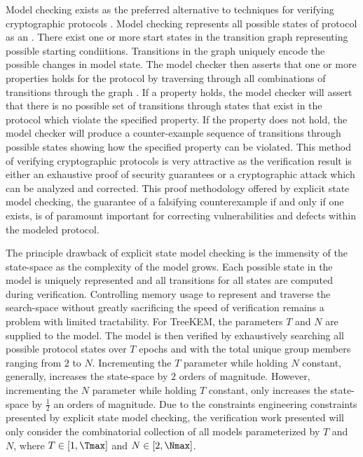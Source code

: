 Model checking exists as the preferred alternative to  techniques for verifying cryptographic protocols \autocite{kacprzak2006comparing, lomuscio2007verification, van2004symbolic}.
Model checking represents all possible states of protocol as an  \autocite{clarke1981design}.
There exist one or more start states in the transition graph representing possible starting condiitions.
Transitions in the graph uniquely encode the possible changes in model state.
The model checker then asserts that one or more properties holds for the protocol by traversing through all combinations of transitions through the graph \autocite{Vardi1986}.
If a property holds, the model checker will assert that there is no possible set of transitions through states that exist in the protocol which violate the specified property.
If the property does not hold, the model checker will produce a counter-example sequence of transitions through possible states showing how the specified property can be violated.
This method of verifying cryptographic protocols is very attractive as the verification result is either an exhaustive proof of security guarantees or a cryptographic attack which can be analyzed and corrected.
This proof methodology offered by explicit state model checking, the guarantee of a falsifying counterexample if and only if one exists, is of paramount important for correcting vulnerabilities and defects within the modeled protocol.

The principle drawback of explicit state model checking is the immensity of the state-space as the complexity of the model grows.
Each possible state in the model is uniquely represented and all transitions for all states are computed during verification.
Controlling memory usage to represent and traverse the search-space without greatly sacrificing the speed of verification remains a problem with limited tractability.
For TreeKEM, the parameters \(T\) and \(N\) are supplied to the model.
The model is then verified by exhaustively searching all possible protocol states over \(T\) epochs and with the total unique group members ranging from \(2\) to \(N\).
Incrementing the \(T\) parameter while holding \(N\) constant, generally, increases the state-space by \(2\) orders of magnitude.
However, incrementing the \(N\) parameter while holding \(T\) constant, only increases the state-space by \(\frac{1}{2}\) an orders of magnitude.
Due to the constraints engineering constraints presented by explicit state model checking, the verification work presented will only consider the combinatorial collection of all models parameterized by \(T\) and \(N\), where \(T \in [1, \Tmax]\) and \(N \in [2, \Nmax]\).


